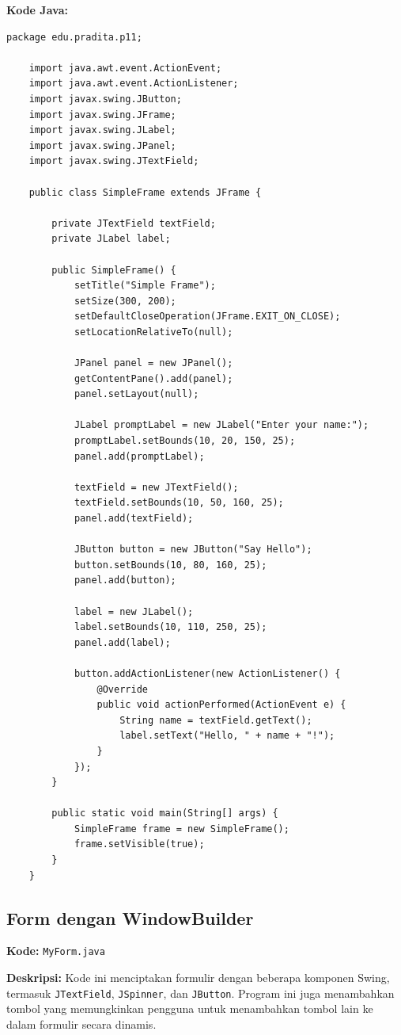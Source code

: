 \textbf{Kode Java:}
\begin{lstlisting}[style=JavaStyle]
	package edu.pradita.p11;
	
	import java.awt.event.ActionEvent;
	import java.awt.event.ActionListener;
	import javax.swing.JButton;
	import javax.swing.JFrame;
	import javax.swing.JLabel;
	import javax.swing.JPanel;
	import javax.swing.JTextField;
	
	public class SimpleFrame extends JFrame {
		
		private JTextField textField;
		private JLabel label;
		
		public SimpleFrame() {
			setTitle("Simple Frame");
			setSize(300, 200);
			setDefaultCloseOperation(JFrame.EXIT_ON_CLOSE);
			setLocationRelativeTo(null);
			
			JPanel panel = new JPanel();
			getContentPane().add(panel);
			panel.setLayout(null);
			
			JLabel promptLabel = new JLabel("Enter your name:");
			promptLabel.setBounds(10, 20, 150, 25);
			panel.add(promptLabel);
			
			textField = new JTextField();
			textField.setBounds(10, 50, 160, 25);
			panel.add(textField);
			
			JButton button = new JButton("Say Hello");
			button.setBounds(10, 80, 160, 25);
			panel.add(button);
			
			label = new JLabel();
			label.setBounds(10, 110, 250, 25);
			panel.add(label);
			
			button.addActionListener(new ActionListener() {
				@Override
				public void actionPerformed(ActionEvent e) {
					String name = textField.getText();
					label.setText("Hello, " + name + "!");
				}
			});
		}
		
		public static void main(String[] args) {
			SimpleFrame frame = new SimpleFrame();
			frame.setVisible(true);
		}
	}
\end{lstlisting}

\subsection{Form dengan WindowBuilder}

\textbf{Kode:} \texttt{MyForm.java}

\textbf{Deskripsi:} Kode ini menciptakan formulir dengan beberapa komponen Swing, termasuk \texttt{JTextField}, \texttt{JSpinner}, dan \texttt{JButton}. Program ini juga menambahkan tombol yang memungkinkan pengguna untuk menambahkan tombol lain ke dalam formulir secara dinamis.


